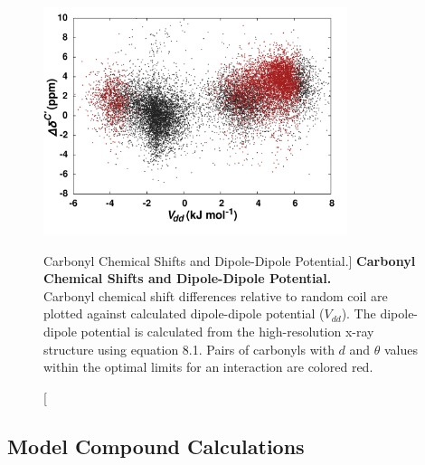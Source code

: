 \begin{figure}
\includegraphics[width=3.5in]{figs/npistar/03-vdd.png}
\caption
      [Carbonyl \cnmr{} Chemical Shifts and Dipole-Dipole Potential.]{
  {\bf Carbonyl \cnmr{} Chemical Shifts and Dipole-Dipole Potential.}
  \\
  Carbonyl \cnmr{} chemical shift differences relative to random coil are
  plotted against calculated dipole-dipole potential ($V_{dd}$). The
  dipole-dipole potential is calculated from the high-resolution x-ray
  structure using equation 8.1. Pairs of carbonyls with $d$ and $\theta$
  values within the optimal limits for an \npistar{} interaction are colored
  red.
}
\end{figure}

\subsection{Model Compound Calculations}

